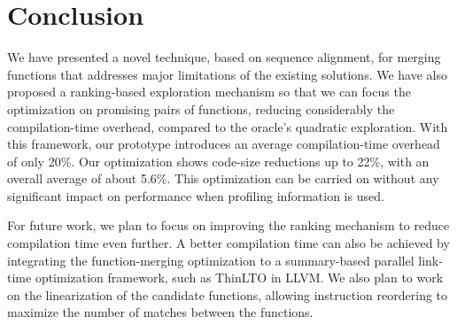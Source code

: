 \vspace{-1ex}
\section{Conclusion}

We have presented a novel technique, based on sequence alignment, for merging
functions that addresses major limitations of the existing solutions.
We have also proposed a ranking-based exploration mechanism so that we can focus
the optimization on promising pairs of functions, reducing considerably the
compilation-time overhead, compared to the oracle's quadratic exploration.
With this framework, our prototype introduces an average
compilation-time overhead of only 20\%.
Our optimization shows code-size reductions up to 22\%, with an overall average
of about 5.6\%.
This optimization can be carried on without any significant impact on
performance when profiling information is used.


For future work, we plan to focus on improving the ranking mechanism to reduce
compilation time even further.
A better compilation time can also be achieved by integrating the
function-merging optimization to a summary-based parallel link-time optimization
framework, such as ThinLTO in LLVM.
We also plan to work on the linearization of the candidate functions, allowing
instruction reordering to maximize the number of matches between the functions.



